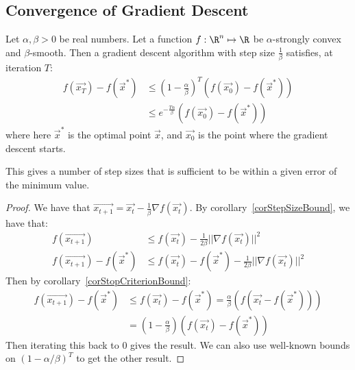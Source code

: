 \documentclass[../Main.tex]{subfiles}
\begin{document}
\subsection{Convergence of Gradient Descent}
\begin{theorem}
    Let $\alpha, \beta > 0$ be real numbers. Let a function $f : \R^n \mapsto \R$ be $\alpha$-strongly convex and $\beta$-smooth. Then a gradient descent algorithm with step size $\frac{1}{\beta}$ satisfies, at iteration $T$:
    \begin{align}
        f(\vec{x_T}) - f(\vec{x}^*) &\leq \left(1 - \frac{\alpha}{\beta}\right)^T (f(\vec{x_0}) - f(\vec{x}^*)) \label{eqnGradDescConvergence} \\
        &\leq e^{-\frac{T\alpha}{\beta}} \left(f(\vec{x_0}) - f(\vec{x}^*)\right) \nonumber
    \end{align}
    where here $\vec{x}^*$ is the optimal point $\vec{x}$, and $\vec{x_0}$ is the point where the gradient descent starts.
\end{theorem}
\begin{remark}
    This gives a number of step sizes that is sufficient to be within a given error of the minimum value.
\end{remark}
\begin{proof}
    We have that $\vec{x_{t + 1}} = \vec{x_t} - \frac{1}{\beta} \nabla f(\vec{x_t})$. By corollary~\ref{corStepSizeBound}, we have that:
    \begin{align*}
        f(\vec{x_{t+1}}) &\leq f(\vec{x_t}) - \frac{1}{2\beta} ||\nabla f(\vec{x_t})||^2 \\
        f(\vec{x_{t+1}}) - f(\vec{x}^*) &\leq f(\vec{x_t}) - f(\vec{x}^*) - \frac{1}{2\beta} ||\nabla f(\vec{x_t})||^2
    \end{align*}
    Then by corollary~\ref{corStopCriterionBound}:
    \begin{align*}
        f(\vec{x_{t+1}}) - f(\vec{x}^*) &\leq f(\vec{x_t}) - f(\vec{x}^*) = \frac{\alpha}{\beta} (f(\vec{x_t}-f(\vec{x}^*))) \\
        &= \left(1-\frac{\alpha}{\beta}\right) (f(\vec{x_t}) - f(\vec{x}^*))
    \end{align*}
    Then iterating this back to 0 gives the result. We can also use well-known bounds on $(1 - \alpha / \beta)^T$ to get the other result.
\end{proof}
\end{document}
